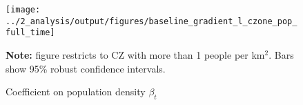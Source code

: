 \begin{figure}[!h]
\centering
\caption{Coefficient on population density $ \beta_t $}
\texttt{[image: ../2\_analysis/output/figures/baseline\_gradient\_l\_czone\_pop\_full\_time]}
\par \begin{minipage}[h]{\textwidth}{\scriptsize\textbf{Note:} figure restricts to CZ with more than 1 people per km$^2$. Bars show 95\% robust confidence intervals.}\end{minipage}
\end{figure}
